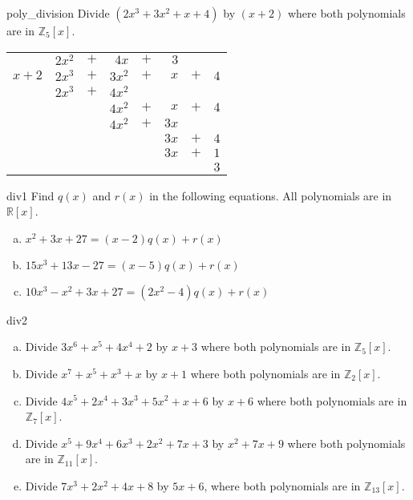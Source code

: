 \begin{example}{poly_division} 
Divide $(2x^3+3x^2+x+4)$ by $(x+2)$ where  both polynomials are in $\mathbb{Z}_5[x]$.
\begin{center}
\begin{tabular}{rrcrcrcr}
        &  $2x^2$  &  $+$  &      $4x$  &  $+$  &    $3$  &       &       \\ \cline{2-8}
 \multicolumn{1}{r|}{$x + 2$}
        &  $2x^3$  &  $+$  &    $3x^2$  &  $+$  & $ x$  &  $+$  &  $4$  \\
        &  $2x^3$  &  $+$  &    $4 x^2$  &       &         &       &       \\ \cline{2-8}
        &         &       &                $4x^2$  & $+$  &  $ x$  &  $+$  &  $4$  \\
        &         &       &                $4x^2$  &  $+$  & $ 3x$  &       &       \\ \cline{4-8}
        &         &       &           &       &                         $3 x$  & $+$  & $4$  \\
        &         &       &           &       &                          $3x$  & $+$  & $1$  \\ \cline{6-8}
        &         &       &           &       &         &       &                               $3$
\end{tabular}
\end{center}
\end{example}

 
\begin{exercise}{div1}
Find $q(x)$ and $r(x)$ in the following equations. All polynomials are in $\mathbb{R}[x]$.
\begin{enumerate} [(a)]
\item $x^2+3x+27=(x-2)q(x) + r(x)$
\item $15x^3+13x-27=(x-5)q(x) + r(x)$
\item $10x^3 - x^2+3x+27=(2x^2-4)q(x) + r(x)$
\end {enumerate}
\end {exercise}

\begin{exercise}{div2}
\begin{enumerate} [(a)]
\item Divide  $  3x^6 + x^5 +4x^4 +2$  by $  x+3 $ where both polynomials are in  $\mathbb{Z}_5[x]$.
\item Divide $ x^7 + x^5 + x^3 + x$  by $ x + 1  $ where both polynomials are in $ \mathbb{Z}_2[x]$.
\item Divide $ 4x^5 + 2x^4 + 3x^3 + 5x^2 + x + 6$ by $x+6$ where both polynomials are in $\mathbb{Z}_7[x]$.
\item Divide $ x^5+9x^4 + 6x^3 + 2x^2 + 7x + 3$ by $x^2+7x+9$ where both polynomials are in $\mathbb{Z}_{11}[x]$.
\item Divide $7x^3 + 2x^2 + 4x + 8$ by $5x+6$, where both polynomials are in $\mathbb{Z}_{13}[x]$.
\end {enumerate}
\end {exercise}


